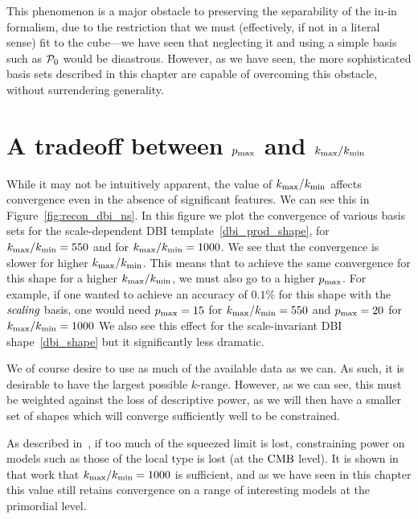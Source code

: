     This phenomenon is a major obstacle to preserving the separability of the in-in formalism,
    due to the restriction that we must (effectively, if not in a literal sense) fit to the cube---we
    have seen that neglecting it and using a simple basis such as $\mathcal{P}_0$ would be disastrous.
    However, as we have seen, the more sophisticated basis sets described in this chapter are capable
    of overcoming this obstacle, without surrendering generality.

\section{A tradeoff between $p_\text{max}$ and ${k_\text{max}}/{k_\text{min}}$}\label{sec:tradeoff}
    While it may not be intuitively apparent, the value of ${k_\text{max}}/{k_\text{min}}$
    affects convergence even in the absence of significant features.
    We can see this in Figure~\ref{fig:recon_dbi_ns}.
    In this figure we plot the convergence of various basis sets for the scale-dependent
    DBI template~\eqref{dbi_prod_shape}, for ${k_\text{max}}/{k_\text{min}}=550$ and
    for ${k_\text{max}}/{k_\text{min}}=1000$. We see that the convergence is slower
    for higher ${k_\text{max}}/{k_\text{min}}$. This means that to achieve the same convergence
    for this shape for a higher ${k_\text{max}}/{k_\text{min}}$, we must also go to a higher $p_\text{max}$.
    For example, if one wanted to achieve an accuracy of $0.1\%$ for this shape
    with the $\textit{scaling}$ basis,
    one would need $p_\text{max}=15$ for ${k_\text{max}}/{k_\text{min}}=550$
    and $p_\text{max}=20$ for ${k_\text{max}}/{k_\text{min}}=1000$
    We also see this effect for the scale-invariant DBI shape~\eqref{dbi_shape}
    but it significantly less dramatic.


    We of course desire to use as much of the available data as we can.
    As such, it is desirable to have the largest possible $k$-range.
    However, as we can see, this must be weighted against the loss
    of descriptive power, as we will then have a smaller set of shapes which
    will converge sufficiently well to be constrained.


    As described in~\cite{Sohn_2021}, if too much of the squeezed limit is lost,
    constraining power on models such as those of the local type is lost (at the $\text{CMB}$ level).
    It is shown in that work that ${k_\text{max}}/{k_\text{min}}=1000$ is sufficient, and as we have seen in this chapter
    this value still retains convergence on a range of interesting models at the primordial level.


